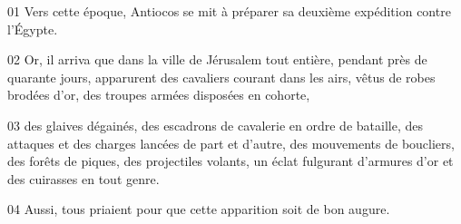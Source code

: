 01 Vers cette époque, Antiocos se mit à préparer sa deuxième expédition contre l’Égypte.

02 Or, il arriva que dans la ville de Jérusalem tout entière, pendant près de quarante jours, apparurent des cavaliers courant dans les airs, vêtus de robes brodées d’or, des troupes armées disposées en cohorte,

03 des glaives dégainés, des escadrons de cavalerie en ordre de bataille, des attaques et des charges lancées de part et d’autre, des mouvements de boucliers, des forêts de piques, des projectiles volants, un éclat fulgurant d’armures d’or et des cuirasses en tout genre.

04 Aussi, tous priaient pour que cette apparition soit de bon augure.
